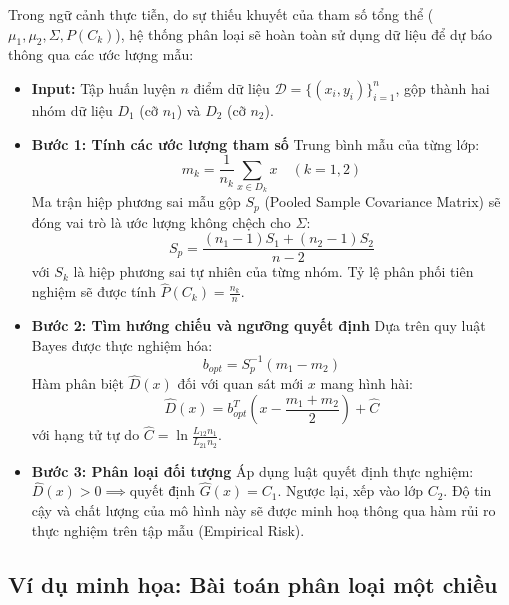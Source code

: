 Trong ngữ cảnh thực tiễn, do sự thiếu khuyết của tham số tổng thể ($\mu_1, \mu_2, \Sigma, P(C_k)$), hệ thống phân loại sẽ hoàn toàn sử dụng dữ liệu để dự báo thông qua các ước lượng mẫu:
\begin{itemize}
    \item \textbf{Input:} Tập huấn luyện $n$ điểm dữ liệu $\mathcal{D} = \{(x_i, y_i)\}_{i=1}^n$, gộp thành hai nhóm dữ liệu $D_1$ (cỡ $n_1$) và $D_2$ (cỡ $n_2$).
    
    \item \textbf{Bước 1: Tính các ước lượng tham số}
    Trung bình mẫu của từng lớp:
    \begin{equation}
        m_k = \frac{1}{n_k} \sum_{x \in D_k} x \quad (k=1, 2)
    \end{equation}
    Ma trận hiệp phương sai mẫu gộp $S_p$ (Pooled Sample Covariance Matrix) sẽ đóng vai trò là ước lượng không chệch cho $\Sigma$:
    \begin{equation}
        S_p = \frac{(n_1 - 1)S_1 + (n_2 - 1)S_2}{n - 2}
    \end{equation}
    với $S_k$ là hiệp phương sai tự nhiên của từng nhóm. Tỷ lệ phân phối tiên nghiệm sẽ được tính $\hat{P}(C_k) = \frac{n_k}{n}$.
    
    \item \textbf{Bước 2: Tìm hướng chiếu và ngưỡng quyết định} 
    Dựa trên quy luật Bayes được thực nghiệm hóa:
    \begin{equation}
        b_{opt} = S_p^{-1}(m_1 - m_2)
    \end{equation}
    Hàm phân biệt $\widehat{D}(x)$ đối với quan sát mới $x$ mang hình hài:
    \begin{equation}
        \widehat{D}(x) = b_{opt}^T \left( x - \frac{m_1 + m_2}{2} \right) + \widehat{C}
    \end{equation}
    với hạng tử tự do $\widehat{C} = \ln \frac{L_{12} n_1}{L_{21} n_2}$.
    
    \item \textbf{Bước 3: Phân loại đối tượng} 
    Áp dụng luật quyết định thực nghiệm: $\widehat{D}(x) > 0 \implies \text{quyết định } \widehat{G}(x) = C_1$. Ngược lại, xếp vào lớp $C_2$. Độ tin cậy và chất lượng của mô hình này sẽ được minh hoạ thông qua hàm rủi ro thực nghiệm trên tập mẫu (Empirical Risk).
\end{itemize}

\subsection{Ví dụ minh họa: Bài toán phân loại một chiều}

